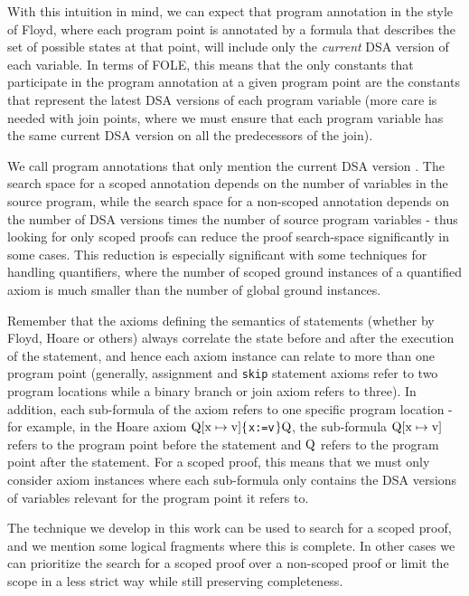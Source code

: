 With this intuition in mind, we can expect that program annotation in the style of Floyd, where each program point is annotated by a formula that describes the set of possible states at that point, will include only the \emph{current} DSA version of each variable.
In terms of FOLE, this means that the only constants that participate in the program annotation at a given program point are the constants that represent the latest DSA versions of each program variable (more care is needed with join points, where we must ensure that each program variable has the same current DSA version on all the predecessors of the join).

We call program annotations that only mention the current DSA version . 
The search space for a scoped annotation depends on the number of variables in the source program, 
while the search space for a non-scoped annotation depends on the number of DSA versions times the number of source program variables - thus looking for only scoped proofs can reduce the proof search-space significantly in some cases.
This reduction is especially significant with some techniques for handling quantifiers, where the number of scoped ground instances of a quantified axiom is much smaller than the number of global ground instances.

Remember that the axioms defining the semantics of statements (whether by Floyd, Hoare or others) always correlate the state before and after the execution of the statement, and hence each axiom instance can relate to more than one program point (generally, assignment and \lstinline|skip| statement axioms refer to two program locations while a binary branch or join axiom refers to three). In addition, each sub-formula of the axiom refers to one specific program location - for example, in the Hoare axiom $\mathrm{Q[x\mapsto v]\{}$\lstinline|x:=v|$\mathrm{\}Q}$, the sub-formula $\mathrm{Q[x\mapsto v]}$ refers to the program point before the statement and $\mathrm{Q}$ refers to the program point after the statement.  
For a scoped proof, this means that we must only consider axiom instances where each sub-formula only contains the DSA versions of variables relevant for the program point it refers to.

The technique we develop in this work can be used to search for a scoped proof, and we mention some logical fragments where this is complete. In other cases we can prioritize the search for a scoped proof over a non-scoped proof or limit the scope in a less strict way while still preserving completeness.


